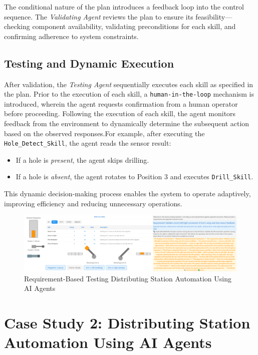 \documentclass[conference]{IEEEtran}
\begin{document}
The conditional nature of the plan introduces a feedback loop into the control sequence. The \textit{Validating Agent} reviews the plan to ensure its feasibility—checking component availability, validating preconditions for each skill, and confirming adherence to system constraints.

\subsection{Testing and Dynamic Execution}
After validation, the \textit{Testing Agent} sequentially executes each skill as specified in the plan. Prior to the execution of each skill, a \texttt{human-in-the-loop} mechanism is introduced, wherein the agent requests confirmation from a human operator before proceeding. Following the execution of each skill, the agent monitors feedback from the environment to dynamically determine the subsequent action based on the observed responses.For example, after executing the \texttt{Hole\_Detect\_Skill}, the agent reads the sensor result:
\begin{itemize}
    \item If a hole is \textit{present}, the agent skips drilling.
    \item If a hole is \textit{absent}, the agent rotates to Position 3 and executes \texttt{Drill\_Skill}.
\end{itemize}

This dynamic decision-making process enables the system to operate adaptively, improving efficiency and reducing unnecessary operations.


\begin{figure}
    \includegraphics[width=1\textwidth]{images/DS_Arch.png}
    \caption{Requirement-Based Testing Distributing Station Automation Using AI Agents}
    \label{fig:ds_arch}
\end{figure}

\section{Case Study 2: Distributing Station Automation Using AI Agents}
\end{document}
